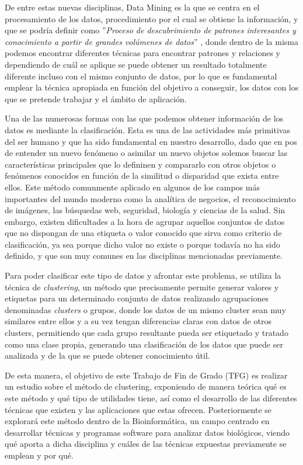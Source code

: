 \documentclass[10pt, a4paper]{article}
\begin{document}
De entre estas nuevas disciplinas, Data Mining es la que se centra en el procesamiento de los datos, procedimiento por el cual se obtiene la información, y que se podría definir como ''\textit{Proceso de descubrimiento de patrones interesantes y conocimiento a partir de grandes volúmenes de datos}'' \cite{LIBRO}, donde dentro de la misma podemos encontrar diferentes técnicas para encontrar patrones y relaciones y dependiendo de cuál se aplique se puede obtener un resultado totalmente diferente incluso con el mismo conjunto de datos, por lo que es fundamental emplear la técnica apropiada en función del objetivo a conseguir, los datos con los que se pretende trabajar y el ámbito de aplicación.

Una de las numerosas formas con las que podemos obtener información de los datos es mediante la clasificación. Esta es una de las actividades más primitivas del ser humano y que ha sido fundamental en nuestro desarrollo, dado que en pos de entender un nuevo fenómeno o asimilar un nuevo objetos solemos buscar las características principales que lo defininen y compararlo con otros objetos o fenómenos conocidos en función de la similitud o disparidad que exista entre ellos. Este método comunmente aplicado en algunos de los campos más importantes del mundo moderno como la analítica de negocios, el reconocimiento de imágenes, las búsquedas web, seguridad, biología y ciencias de la salud. Sin embargo, existen dificultades a la hora de agrupar aquellos conjuntos de datos que no dispongan de una etiqueta o valor conocido que sirva como criterio de clasificación, ya sea porque dicho valor no existe o porque todavía no ha sido definido, y que son muy comunes en las disciplinas mencionadas previamente. 

Para poder clasificar este tipo de datos y afrontar este problema, se utiliza la técnica de \textit{clustering}, un método que precisamente permite generar valores y etiquetas para un determinado conjunto de datos realizando agrupaciones denominadas \textit{clusters} o grupos, donde los datos de un mismo cluster sean muy similares entre ellos y a su vez tengan diferencias claras con datos de otros clusters, permitiendo que cada grupo resultante pueda ser etiquetado y tratado como una clase propia, generando una clasificación de los datos que puede ser analizada y de la que se puede obtener conocimiento útil.

De esta manera, el objetivo de este Trabajo de Fin de Grado (TFG) es realizar un estudio sobre el método de clustering, exponiendo de manera teórica qué es este método y qué tipo de utilidades tiene, así como el desarrollo de las diferentes técnicas que existen y las aplicaciones que estas ofrecen. Posteriormente se explorará este método dentro de la Bioinformática, un campo centrado en desarrollar técnicas y programas software para analizar datos biológicos, viendo qué aporta a dicha disciplina y cuáles de las técnicas expuestas previamente se emplean y por qué. 
\end{document}
